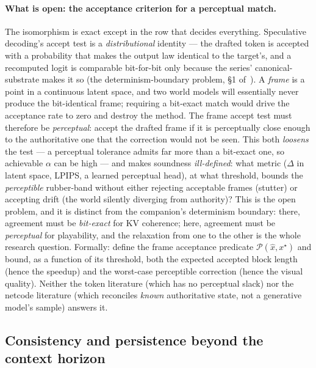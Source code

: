 \documentclass[11pt]{article}
\begin{document}
\paragraph{What is open: the acceptance criterion for a perceptual match.} The isomorphism is exact except in
the row that decides everything. Speculative decoding's accept test is a \emph{distributional} identity ---
the drafted token is accepted with a probability that makes the output law identical to the target's, and a
recomputed logit is comparable bit-for-bit only because the series' canonical- substrate makes it so
(the determinism-boundary problem, \S1 of~\cite{openproblems}). A \emph{frame} is a point in a continuous
latent space, and two world models will essentially never produce the bit-identical frame; requiring a
bit-exact match would drive the acceptance rate to zero and destroy the method. The frame accept test must
therefore be \emph{perceptual}: accept the drafted frame if it is perceptually close enough to the
authoritative one that the correction would not be seen. This both \emph{loosens} the test --- a perceptual
tolerance admits far more than a bit-exact one, so achievable $\alpha$ can be high --- and makes soundness
\emph{ill-defined}: what metric ($\Delta$ in latent space, LPIPS, a learned perceptual head), at what
threshold, bounds the \emph{perceptible} rubber-band without either rejecting acceptable frames (stutter) or
accepting drift (the world silently diverging from authority)? This is the open problem, and it is distinct
from the companion's determinism boundary: there, agreement must be \emph{bit-exact} for KV coherence; here,
agreement must be \emph{perceptual} for playability, and the relaxation from one to the other is the whole
research question. Formally: define the frame acceptance predicate $\mathcal{P}(\hat{x},x^\star)$ and bound,
as a function of its threshold, both the expected accepted block length (hence the speedup) and the
worst-case perceptible correction (hence the visual quality). Neither the token literature (which has no
perceptual slack) nor the netcode literature (which reconciles \emph{known} authoritative state, not a
generative model's sample) answers it.

\subsection{Consistency and persistence beyond the context horizon}
\label{sec:persist}
\end{document}
